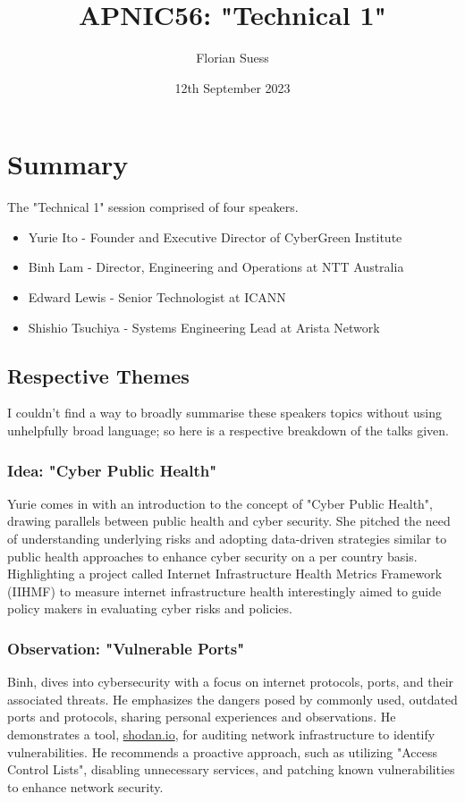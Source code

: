 \documentclass[twocolumn]{article}
\title{APNIC56: "Technical 1"}
\date{12th September 2023}
\author{Florian Suess}
\begin{document}
\maketitle

\section*{Summary}
The "Technical 1" session comprised of four speakers.

\begin{itemize}
				\item Yurie Ito - Founder and Executive Director of CyberGreen Institute
				\item Binh Lam - Director, Engineering and Operations at NTT Australia
				\item Edward Lewis - Senior Technologist at ICANN
				\item Shishio Tsuchiya - Systems Engineering Lead at Arista Network
\end{itemize}

\subsection*{Respective Themes}
I couldn't find a way to broadly summarise these speakers topics without using unhelpfully broad language; so here is a respective breakdown of the talks given.

\subsubsection*{Idea: "Cyber Public Health"}
Yurie comes in with an introduction to the concept of "Cyber Public Health", drawing parallels between public health and cyber security. She pitched the need of understanding underlying risks and adopting data-driven strategies similar to public health approaches to enhance cyber security on a per country basis. Highlighting a project called Internet Infrastructure Health Metrics Framework (IIHMF) to measure internet infrastructure health interestingly aimed to guide policy makers in evaluating cyber risks and policies.

\subsubsection*{Observation: "Vulnerable Ports"}
Binh, dives into cybersecurity with a focus on internet protocols, ports, and their associated threats. He emphasizes the dangers posed by commonly used, outdated ports and protocols, sharing personal experiences and observations. He demonstrates a tool, \href{https://shodan.io}{shodan.io}, for auditing network infrastructure to identify vulnerabilities. He recommends a proactive approach, such as utilizing "Access Control Lists", disabling unnecessary services, and patching known vulnerabilities to enhance network security.
\end{document}
